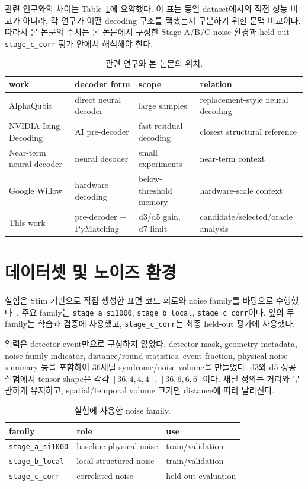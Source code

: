 \documentclass[aps,prd,12pt,twocolumn,superscriptaddress,showkeys,floatfix]{revtex4-2}
\begin{document}
관련 연구와의 차이는 Table~\ref{tab:related-work}에 요약했다. 이 표는 동일
dataset에서의 직접 성능 비교가 아니라, 각 연구가 어떤 decoding 구조를 택했는지
구분하기 위한 문맥 비교이다. 따라서 본 논문의 수치는 본 논문에서 구성한
Stage A/B/C noise 환경과 held-out \texttt{stage\_c\_corr} 평가 안에서 해석해야
한다.

\begin{table}[t]
\caption{관련 연구와 본 논문의 위치.}
\label{tab:related-work}
\centering
\small
\begin{tabular}{llll}
\toprule
work & decoder form & scope & relation \\
\midrule
AlphaQubit~\cite{alphaqubit} & direct neural decoder & large samples & replacement-style neural decoding \\
NVIDIA Ising-Decoding~\cite{nvidiaising} & AI pre-decoder & fast residual decoding & closest structural reference \\
Near-term neural decoder~\cite{neartermnn} & neural decoder & small experiments & near-term context \\
Google Willow~\cite{willowthreshold} & hardware decoding & below-threshold memory & hardware-scale context \\
This work & pre-decoder + PyMatching & d3/d5 gain, d7 limit & candidate/selected/oracle analysis \\
\bottomrule
\end{tabular}
\end{table}

\section{데이터셋 및 노이즈 환경}

실험은 Stim 기반으로 직접 생성한 표면 코드 회로와 noise family를 바탕으로
수행했다~\cite{stim}. 주요 family는 \texttt{stage\_a\_si1000},
\texttt{stage\_b\_local}, \texttt{stage\_c\_corr}이다. 앞의 두 family는 학습과
검증에 사용했고, \texttt{stage\_c\_corr}는 최종 held-out 평가에 사용했다.

입력은 detector event만으로 구성하지 않았다. detector mask, geometry metadata,
noise-family indicator, distance/round statistics, event fraction,
physical-noise summary 등을 포함하여 36채널 syndrome/noise volume을 만들었다.
d3와 d5 성공 실험에서 tensor shape은 각각 \([36,4,4,4]\),
\([36,6,6,6]\)이다. 채널 정의는 거리와 무관하게 유지하고, spatial/temporal
volume 크기만 distance에 따라 달라진다.

\begin{table}[t]
\caption{실험에 사용한 noise family.}
\label{tab:noise-family}
\centering
\begin{tabular}{lll}
\toprule
family & role & use \\
\midrule
\texttt{stage\_a\_si1000} & baseline physical noise & train/validation \\
\texttt{stage\_b\_local} & local structured noise & train/validation \\
\texttt{stage\_c\_corr} & correlated noise & held-out evaluation \\
\bottomrule
\end{tabular}
\end{table}
\end{document}
